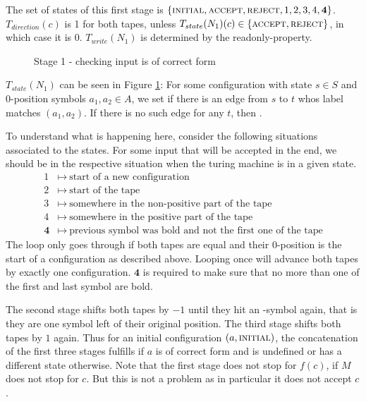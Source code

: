 	The set of states of this first stage is $\{\text{\scshape{initial}},\text{\scshape{accept}},\text{\scshape{reject}},1,2,3,4,\textbf{4}\}$.
	$T_{direction}(c)$ is 1 for both tapes, unless $T_{state}(N_1)(c) \in \{\text{\scshape{accept}},\text{\scshape{reject}}\}$, in which case it is 0. $T_{write}(N_1)$ is determined by the readonly-property.
	
	\begin{figure}
		\centering
		
		\caption{Stage 1 - checking input is of correct form}
		\label{turing_machines:main_theorem:fig_stage1}
	\end{figure}

	$T_{state}(N_1)$ can be seen in Figure \ref{turing_machines:main_theorem:fig_stage1}:
	For some configuration with state $s \in S$ and $0$-position symbols $a_1,a_2 \in A$, we set  if there is an edge from $s$ to $t$ whos label matches $(a_1,a_2)$.
	If there is no such edge for any $t$, then .

	To understand what is happening here, consider the following situations associated to the states.
	For some input that will be accepted in the end, we should be in the respective situation when the turing machine is in a given state.
	\begin{align*}
		1 &\mapsto~\text{start of a new configuration} \\
		2 &\mapsto~\text{start of the tape} \\
		3 &\mapsto~\text{somewhere in the non-positive part of the tape} \\
		4 &\mapsto~\text{somewhere in the positive part of the tape} \\
		\textbf{4} &\mapsto~\text{previous symbol was bold and not the first one of the tape}
	\end{align*}
	The loop  only goes through if both tapes are equal and their $0$-position is the start of a configuration as described above.
	Looping once will advance both tapes by exactly one configuration.
	$\textbf{4}$ is required to make sure that no more than one of the first and last symbol are bold.

	The second stage shifts both tapes by $-1$ until they hit an \EMP-symbol again, that is they are one symbol left of their original position.
	The third stage shifts both tapes by $1$ again.
	Thus for an initial configuration $(a,\text{\scshape{initial}})$, the concatenation of the first three stages fulfills  if $a$ is of correct form and is undefined or has a different state otherwise.
	Note that the first stage does not stop for $f(c)$, if $M$ does not stop for $c$. But this is not a problem as in particular it does not accept $c$.


